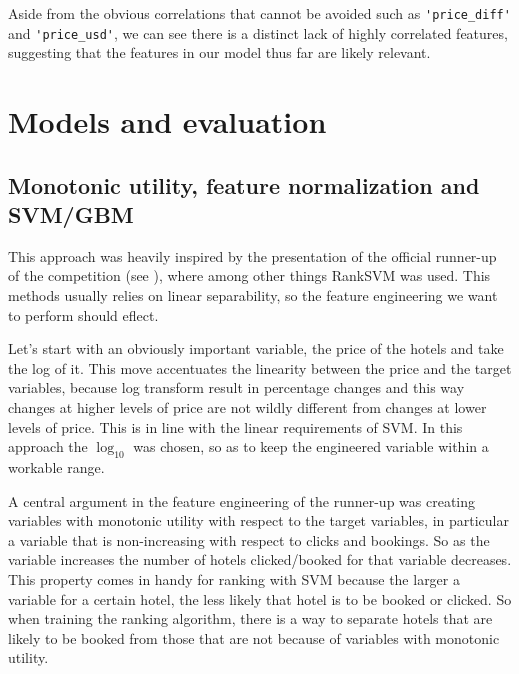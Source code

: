\documentclass{llncs}
\begin{document}
Aside from the obvious correlations that cannot be avoided such as \verb!'price_diff'! and \verb!'price_usd'!, we can see there is a distinct lack of highly correlated features, suggesting that the features in our model thus far are likely relevant. 


\section{Models and evaluation}


\subsection{Monotonic utility, feature normalization and SVM/GBM}
This approach was heavily inspired by the presentation of the official runner-up of the competition (see \cite{Wang2013}), where among other things RankSVM was used. This methods usually relies on linear separability, so the feature engineering we want to perform should eflect.

Let's start with an obviously important variable, the price of the hotels and take the log of it. This move accentuates the linearity between the price and the target variables, because log transform result in percentage changes and this way changes at higher levels of price are not wildly different from changes at lower levels of price. This is in line with the linear requirements of SVM. In this approach the $\log_{10}$ was chosen, so as to keep the engineered variable within a workable range.

A central argument in the feature engineering of the runner-up was creating variables with monotonic utility with respect to the target variables, in particular a variable that is non-increasing with respect to clicks and bookings. So as the variable increases the number of hotels clicked/booked for that variable decreases. This property comes in handy for ranking with SVM because the larger a variable for a certain hotel, the less likely that hotel is to be booked or clicked. So when training the ranking algorithm, there is a way to separate hotels that are likely to be booked from those that are not because of variables with monotonic utility.
\end{document}
